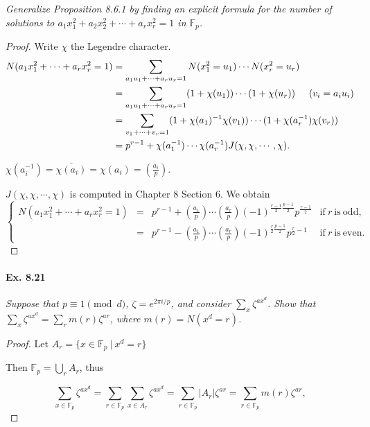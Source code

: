 \documentclass[11pt,a4paper]{article}
\newcommand{\F}{\mathbb{F}}
\newcommand{\legendre}[2]{\genfrac{(}{)}{}{}{#1}{#2}}
\begin{document}
{{\it Generalize Proposition 8.6.1 by finding an explicit formula for the number of solutions to $a_1x_1^2+a_2x_2^2+\cdots+a_rx_r^2 = 1$ in $\F_p$.
}

\begin{proof}
Write $\chi$ the Legendre character.
\begin{align*}
N(a_1x_1^2+\cdots+a_r x_r^2=1)&=\sum\limits_{a_1u_1+\cdots+a_r u_r=1}N(x_1^2=u_1)\cdots N(x_r^2=u_r)\\
&=\sum\limits_{a_1u_1+\cdots+a_r u_r=1}(1+\chi(u_1))\cdots(1+\chi(u_r))  \hspace{0.5cm}(v_i = a_i u_i)\\
&=\sum\limits_{v_1+\cdots+v_r=1}(1+\chi(a_1)^{-1}\chi(v_1))\cdots(1+\chi(a_r^{-1})\chi(v_r))\\
&=p^{r-1} + \chi(a_1^{-1})\cdots\chi(a_r^{-1})J(\chi,\chi,\cdots,\chi).
\end{align*}

$\chi(a_i^{-1}) = \overline{\chi(a_i)} = \chi(a_i) = \legendre{a_i}{p}.$

$J(\chi,\chi,\cdots,\chi)$ is computed in Chapter 8 Section 6. We obtain
$$
\left\{
\begin{array}{ccll}
 N(a_1x_1^2+\cdots+a_r x_r^2=1)  & =  & p^{r-1}+\legendre{a_1}{p}\cdots\legendre{a_r}{p}(-1)^{\frac{r-1}{2}\frac{p-1}{2}}p^{\frac{r-1}{2}}&\mathrm{if}\ r\ \mathrm{is}\ \mathrm{odd}, \\
  &  = &p^{r-1}-\legendre{a_1}{p}\cdots\legendre{a_r}{p}(-1)^{\frac{r}{2}\frac{p-1}{2}}p^{\frac{r}{2}-1}&\mathrm{if}\ r\  \mathrm{is}\ \mathrm{even}.
\end{array}
\right.
$$
\end{proof}

\paragraph{Ex. 8.21}

{\it Suppose that $p\equiv 1 \pmod d$, $\zeta = e^{2\pi i/p}$, and consider $\sum_x \zeta^{ax^d}$. Show that $\sum_x \zeta^{ax^d} = \sum_r m(r)\zeta^{ar}$, where $m(r) = N(x^d = r)$.
}

\begin{proof}
Let $A_r = \{x \in \mathbb{F}_p \ \vert \ x^d=r\}$

Then  $\mathbb{F}_p = \bigcup_r A_r$, thus

$$\sum\limits_{x\in \mathbb{F}_p} \zeta^{ax^d} = \sum\limits_{r \in \mathbb{F}_p} \sum\limits_{x \in A_r} \zeta^{a x^d} = \sum\limits_{r \in \mathbb{F}_p} \vert A_r\vert \zeta^{ar}= \sum\limits_{r \in \mathbb{F}_p} m(r)\zeta^{ar},$$


\end{proof}}
\end{document}
